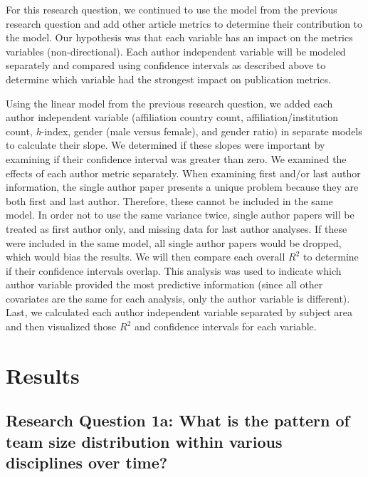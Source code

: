 \documentclass[
  man,floatsintext]{apa6}
\begin{document}
For this research question, we continued to use the model from the previous research question and add other article metrics to determine their contribution to the model. Our hypothesis was that each variable has an impact on the metrics variables (non-directional). Each author independent variable will be modeled separately and compared using confidence intervals as described above to determine which variable had the strongest impact on publication metrics.

Using the linear model from the previous research question, we added each author independent variable (affiliation country count, affiliation/institution count, \emph{h}-index, gender (male versus female), and gender ratio) in separate models to calculate their slope. We determined if these slopes were important by examining if their confidence interval was greater than zero. We examined the effects of each author metric separately. When examining first and/or last author information, the single author paper presents a unique problem because they are both first and last author. Therefore, these cannot be included in the same model. In order not to use the same variance twice, single author papers will be treated as first author only, and missing data for last author analyses. If these were included in the same model, all single author papers would be dropped, which would bias the results. We will then compare each overall \(R^2\) to determine if their confidence intervals overlap. This analysis was used to indicate which author variable provided the most predictive information (since all other covariates are the same for each analysis, only the author variable is different). Last, we calculated each author independent variable separated by subject area and then visualized those \(R^2\) and confidence intervals for each variable.

\hypertarget{results}{%
\section{Results}\label{results}}

\hypertarget{research-question-1a-what-is-the-pattern-of-team-size-distribution-within-various-disciplines-over-time}{%
\subsection{Research Question 1a: What is the pattern of team size distribution within various disciplines over time?}\label{research-question-1a-what-is-the-pattern-of-team-size-distribution-within-various-disciplines-over-time}}
\end{document}
